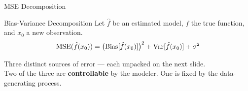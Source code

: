\documentclass[aspectratio=169, 11pt]{beamer}
\begin{document}
\begin{frame}{MSE Decomposition}
  \begin{definitionbox}{Bias-Variance Decomposition}
    {\small
    Let $\hat{f}$ be an estimated model, $f$ the true function,
    and $x_0$ a new observation.
    \[
      \operatorname{MSE}(\hat{f}(x_0))
      = \bigl(\operatorname{Bias}[\hat{f}(x_0)]\bigr)^2
        + \operatorname{Var}[\hat{f}(x_0)] + \sigma^2
    \]
    }
  \end{definitionbox}
  \vspace{0.15cm}
  Three distinct sources of error --- each unpacked on the next slide.\\[3pt]
  {\small Two of the three are \textbf{controllable} by the modeler.
  One is fixed by the data-generating process.}
  \vspace{0.1cm}
  \begin{center}
  \end{center}
\end{frame}
\end{document}
